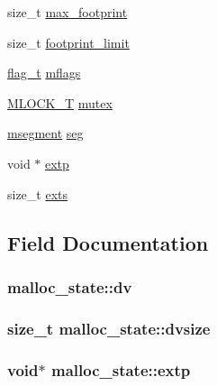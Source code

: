 \begin{DoxyCompactItemize}
size\+\_\+t \hyperlink{structmalloc__state_ac5c720358079598dfb5d699124e761c8}{max\+\_\+footprint}
\item 
size\+\_\+t \hyperlink{structmalloc__state_ab589c6129376d79aab99babfe55fe048}{footprint\+\_\+limit}
\item 
\hyperlink{dl__malloc_8c_a98d45780d5103f1a6b54a549a3d12de2}{flag\+\_\+t} \hyperlink{structmalloc__state_a44ff83ca07796cad96f2289471c88d2d}{mflags}
\item 
\hyperlink{dl__malloc_8c_a530e2a673707b46623919e33d02ebdd2}{M\+L\+O\+C\+K\+\_\+T} \hyperlink{structmalloc__state_aafbde3a2fbb7df9480eb14521e5624da}{mutex}
\item 
\hyperlink{dl__malloc_8c_aefb4243356502f3504318b435638ba57}{msegment} \hyperlink{structmalloc__state_a899c69eca79f165b03913063a93d973a}{seg}
\item 
void $\ast$ \hyperlink{structmalloc__state_aa605a719561fc44ce2ce7165e6dcb897}{extp}
\item 
size\+\_\+t \hyperlink{structmalloc__state_af3c1e272f4107a5006ee10429cb2232a}{exts}
\end{DoxyCompactItemize}


\subsection{Field Documentation}
\subsubsection[{\texorpdfstring{dv}{dv}}]{ malloc\+\_\+state\+::dv}\hypertarget{structmalloc__state_a840943ad4baaddbaaa5defe954ec06b9}{}\label{structmalloc__state_a840943ad4baaddbaaa5defe954ec06b9}
\subsubsection[{\texorpdfstring{dvsize}{dvsize}}]{\setlength{\rightskip}{0pt plus 5cm}size\+\_\+t malloc\+\_\+state\+::dvsize}\hypertarget{structmalloc__state_ae2e6a3ed8e8abaf03e47917057f1012d}{}\label{structmalloc__state_ae2e6a3ed8e8abaf03e47917057f1012d}
\subsubsection[{\texorpdfstring{extp}{extp}}]{\setlength{\rightskip}{0pt plus 5cm}void$\ast$ malloc\+\_\+state\+::extp}\hypertarget{structmalloc__state_aa605a719561fc44ce2ce7165e6dcb897}{}\label{structmalloc__state_aa605a719561fc44ce2ce7165e6dcb897}
